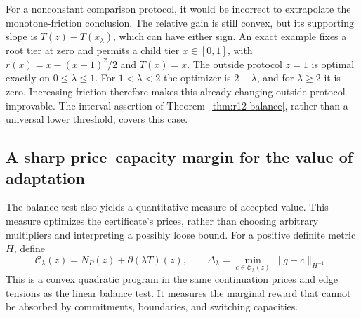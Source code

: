 \documentclass[11pt,letterpaper]{article}
\theoremstyle{definition}
\newcommand{\1}{\mathbf 1}
\begin{document}
For a nonconstant comparison protocol, it would be incorrect to extrapolate the monotone-friction conclusion. The relative gain is still convex, but its supporting slope is $T(z)-T(x_\lambda)$, which can have either sign. An exact example fixes a root tier at zero and permits a child tier $x\in[0,1]$, with $r(x)=x-(x-1)^2/2$ and $T(x)=x$. The outside protocol $z=1$ is optimal exactly on $0\leq\lambda\leq1$. For $1<\lambda<2$ the optimizer is $2-\lambda$, and for $\lambda\geq2$ it is zero. Increasing friction therefore makes this already-changing outside protocol improvable. The interval assertion of Theorem~\ref{thm:r12-balance}, rather than a universal lower threshold, covers this case.


\subsection{A sharp price--capacity margin for the value of adaptation}
The balance test also yields a quantitative measure of accepted value. This measure optimizes the certificate's prices, rather than choosing arbitrary multipliers and interpreting a possibly loose bound. For a positive definite metric $H$, define
\begin{equation}\label{eq:r12-margin}
 \mathcal C_\lambda(z)=N_P(z)+\partial(\lambda T)(z),\qquad
 \Delta_\lambda=\min_{c\in\mathcal C_\lambda(z)}\|g-c\|_{H^{-1}}.
\end{equation}
This is a convex quadratic program in the same continuation prices and edge tensions as the linear balance test. It measures the marginal reward that cannot be absorbed by commitments, boundaries, and switching capacities.
\end{document}
